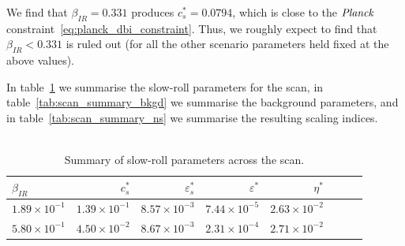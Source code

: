     We find that $\beta_{IR}=0.331$ produces $c_s^{*}=0.0794$,
    which is close to the $\textit{Planck}$ constraint~\eqref{eq:planck_dbi_constraint}.
    Thus, we roughly expect to find that $\beta_{IR}<0.331$ is ruled out
    (for all the other scenario parameters held fixed at the above values).


    In table~\ref{tab:scan_summary_sr} we summarise the slow-roll parameters for the scan,
    in table~\ref{tab:scan_summary_bkgd} we summarise the background parameters,
    and in table~\ref{tab:scan_summary_ns} we summarise the resulting scaling indices.
    \\
    \\
\begin{table}[h!]
  \begin{center}
    \begin{tabular}{lrrrrrrr}
        \toprule
        $\beta_{IR}$ &    $c_s^{*}$ &  $\varepsilon_s^{*}$ &   $\varepsilon^{*}$ &   $\eta^{*}$ \\
        \midrule
        $1.89\times 10^{-1}$  &  $1.39\times 10^{-1}$  &  $  8.57\times 10^{-3}$  &  $7.44\times 10^{-5}$  &  $2.63\times 10^{-2}$ \\
        $5.80\times 10^{-1}$  &  $4.50\times 10^{-2}$  &  $  8.67\times 10^{-3}$  &  $2.31\times 10^{-4}$  &  $2.71\times 10^{-2}$ \\
        \bottomrule
    \end{tabular}
    \caption{Summary of slow-roll parameters across the scan.}\label{tab:scan_summary_sr}
  \end{center}
\end{table}
